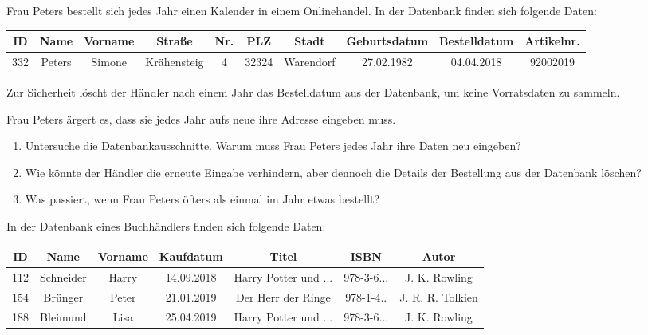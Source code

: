 \documentclass[10pt, a5paper,landscape]{scrartcl}
\begin{document}
\clearpage
\ReiheTitel

Frau Peters bestellt sich jedes Jahr einen Kalender in einem Onlinehandel. In der Datenbank finden sich folgende Daten:

{\footnotesize
\begin{tabular}{|*{10}{c|}}\hline
	\rowcolor{ngb.tabelle.kopf.hg} ID & Name & Vorname & Straße & Nr. & PLZ & Stadt & Geburtsdatum & Bestelldatum & Artikelnr. \\ \hline
	332 & Peters & Simone & Krähensteig & 4 & 32324 & Warendorf & 27.02.1982 & 04.04.2018 & 92002019 \\\hline
\end{tabular}}

Zur Sicherheit löscht der Händler nach einem Jahr das Bestelldatum aus der Datenbank, um keine Vorratsdaten zu sammeln.

Frau Peters ärgert es, dass sie jedes Jahr aufs neue ihre Adresse eingeben muss.

\vspace{1em}
\begin{aufgabe}
\begin{enumerate}
	\item Untersuche die Datenbankausschnitte. Warum muss Frau Peters jedes Jahr ihre Daten neu eingeben?
	\item Wie könnte der Händler die erneute Eingabe verhindern, aber dennoch die Details der Bestellung aus der Datenbank löschen?
	\item Was passiert, wenn Frau Peters öfters als einmal im Jahr etwas bestellt? 
\end{enumerate}
\end{aufgabe}

\clearpage
\ReiheTitel

In der Datenbank eines Buchhändlers finden sich folgende Daten:

{\footnotesize
\begin{tabular}{|*{7}{c|}}\hline
	\rowcolor{ngb.tabelle.kopf.hg} ID & Name & Vorname & Kaufdatum & Titel & ISBN & Autor\\ \hline
	112 & Schneider & Harry & 14.09.2018 & Harry Potter und ... & 978-3-6... & J. K. Rowling \\\hline
	154 & Brünger & Peter & 21.01.2019 & Der Herr der Ringe & 978-1-4.. & J. R. R. Tolkien \\\hline
	188 & Bleimund & Lisa & 25.04.2019 &  Harry Potter und ... & 978-3-6... & J. K. Rowling \\\hline
\end{tabular}}
\end{document}
